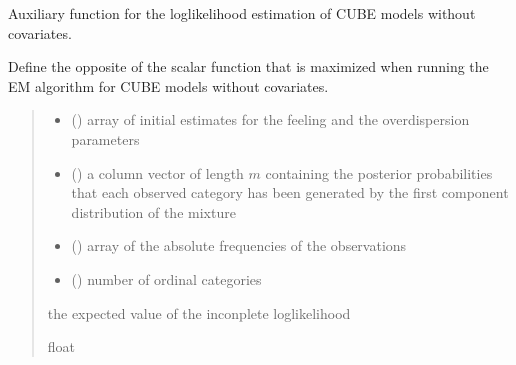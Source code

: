 \documentclass[letterpaper,10pt,english]{sphinxmanual}
\begin{document}

\begin{fulllineitems}
\label{\detokenize{cubmods:cubmods.cube.effecube}}
\pysigstartsignatures
{}
\pysigstopsignatures
\sphinxAtStartPar
Auxiliary function for the log\sphinxhyphen{}likelihood estimation of CUBE models without covariates.

\sphinxAtStartPar
Define the opposite of the scalar function that is maximized when running the E\sphinxhyphen{}M 
algorithm for CUBE models without covariates.
\begin{quote}\begin{description}
\begin{itemize}
\item {} 
\sphinxAtStartPar
{} () \textendash{} array of initial estimates for the feeling and the overdispersion parameters

\item {} 
\sphinxAtStartPar
{} () \textendash{} a column vector of length \(m\) containing the posterior
probabilities that each observed category has been generated by the first component distribution 
of the mixture

\item {} 
\sphinxAtStartPar
{} () \textendash{} array of the absolute frequencies of the observations

\item {} 
\sphinxAtStartPar
{} () \textendash{} number of ordinal categories

\end{itemize}

\sphinxAtStartPar
the expected value of the inconplete log\sphinxhyphen{}likelihood

\sphinxAtStartPar
float

\end{description}\end{quote}

\end{fulllineitems}
\end{document}
